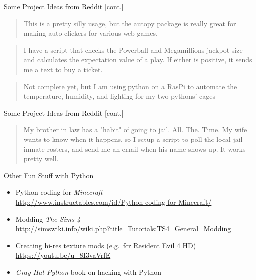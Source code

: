 \documentclass[xcolor={usenames,svgnames,x11names,dvipsnames,table}]{beamer}
\begin{document}
\begin{frame}{Some Project Ideas from Reddit [cont.]}
    \begin{quote}
        This is a pretty silly usage, but the autopy package is really great for making auto-clickers for various web-games. 
    \end{quote}

    \pause
    \begin{quote}
        I have a script that checks the Powerball and Megamillions jackpot size and calculates the expectation value of a play. If either is positive, it sends me a text to buy a ticket.
    \end{quote}

    \pause
    \begin{quote}
        Not complete yet, but I am using python on a RasPi to automate the temperature, humidity, and lighting for my two pythons' cages
    \end{quote}
\end{frame}

\begin{frame}{Some Project Ideas from Reddit [cont.]}
    \begin{quote}
        My brother in law has a "habit" of going to jail.
        All. The. Time.
        My wife wants to know when it happens, so I setup a script to poll the local jail inmate rosters, and send me an email when his name shows up.
        It works pretty well.
    \end{quote}
\end{frame}

\begin{frame}{Other Fun Stuff with Python}
    \begin{itemize}
        \item Python coding for \emph{Minecraft}\\
            \href{http://www.instructables.com/id/Python-coding-for-Minecraft/}{http://www.instructables.com/id/Python-coding-for-Minecraft/}
        \item Modding \emph{The Sims 4}\\
            \href{http://simswiki.info/wiki.php?title=Tutorials:TS4_General_Modding}{http://simswiki.info/wiki.php?title=Tutorials:TS4\_General\_Modding}
        \item Creating hi-res texture mods (e.g.\ for Resident Evil 4 HD)\\
            \href{https://youtu.be/u_8I3vaVrfE}{https://youtu.be/u\_8I3vaVrfE}
        \item \emph{Gray Hat Python} book on hacking with Python
    \end{itemize}
\end{frame}
\end{document}

